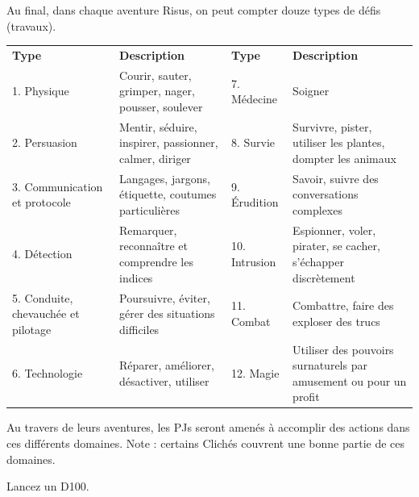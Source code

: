 \begin{frame}[b]


Au final, dans chaque aventure Risus, on peut compter douze types de défis (travaux).

\vspace{0.2cm}

\begin{tabular}{p{3cm}p{5.1cm} | p{3cm}p{5.1cm}}
\textbf{Type} & \textbf{Description} & \textbf{Type} & \textbf{Description} \\
1. Physique & Courir, sauter, grimper, nager, pousser, soulever & 7. Médecine & Soigner \\
2. Persuasion & Mentir, séduire, inspirer, passionner, calmer, diriger & 8. Survie & Survivre, pister, utiliser les plantes, dompter les animaux \\
3. Communication et protocole & Langages, jargons, étiquette, coutumes particulières & 9. Érudition & Savoir, suivre des conversations complexes \\
4. Détection & Remarquer, reconnaître et comprendre les indices & 10. Intrusion & Espionner, voler, pirater, se cacher, s'échapper discrètement \\
5. Conduite, chevauchée et pilotage & Poursuivre, éviter, gérer des situations difficiles & 11. Combat & Combattre, faire des exploser des trucs \\
6. Technologie & Réparer, améliorer, désactiver, utiliser & 12. Magie & Utiliser des pouvoirs surnaturels par amusement ou pour un profit \\
\end{tabular}

\vspace{0.2cm}

Au travers de leurs aventures, les PJs seront amenés à accomplir des actions dans ces différents domaines. Note : certains Clichés couvrent une bonne partie de ces domaines.


Lancez un D100.

\vspace{0.2cm}


\end{frame}
